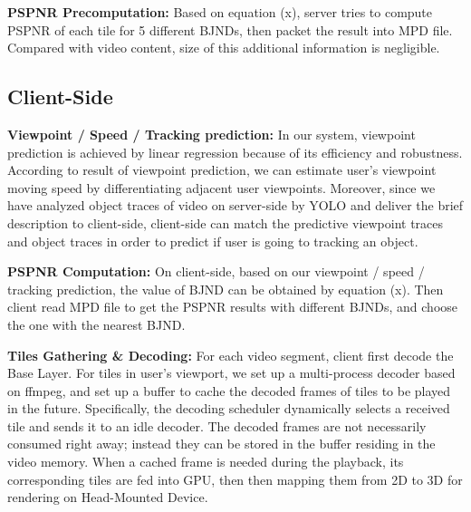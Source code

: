 \textbf{PSPNR Precomputation:} Based on equation (x), server tries to compute PSPNR of each tile for 5 different BJNDs, then packet the result into MPD file. Compared with video content, size of this additional information is negligible.

\subsection{Client-Side}

\textbf{Viewpoint / Speed / Tracking prediction:} In our system, viewpoint prediction is achieved by linear regression because of its efficiency and robustness. According to result of viewpoint prediction, we can estimate user's viewpoint moving speed by differentiating adjacent user viewpoints. Moreover, since we have analyzed object traces of video on server-side by YOLO \cite{yolo} and deliver the brief description to client-side, client-side can match the predictive viewpoint traces and object traces in order to predict if user is going to tracking an object.

\textbf{PSPNR Computation:} On client-side, based on our viewpoint / speed / tracking prediction, the value of BJND can be obtained by equation (x). Then client read MPD file to get the PSPNR results with different BJNDs, and choose the one with the nearest BJND.

\textbf{Tiles Gathering \& Decoding:} For each video segment, client first decode the Base Layer. For tiles in user's viewport, we set up a multi-process decoder based on ffmpeg, and set up a buffer to cache the decoded frames of tiles to be played in the future. Specifically, the decoding scheduler dynamically selects a received tile and sends it to an idle decoder. The decoded frames are not necessarily consumed right away; instead they can be stored in the buffer residing in the video memory. When a cached frame is needed during the playback, its corresponding tiles are fed into GPU, then then mapping them from 2D to 3D for rendering on Head-Mounted Device.